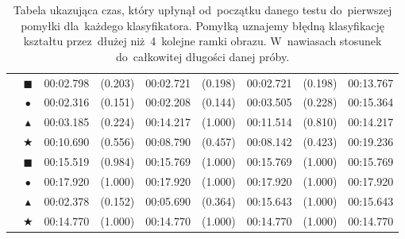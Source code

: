 \documentclass[11pt,a4paper]{article}
\begin{document}
\begin{table}[H]
\begin{tabularx}{\textwidth}{|c|c|Yr|Yr|Yr|Y|}
        \hline
        \hline
        & $\blacksquare$ & 00:02.798 & \footnotesize{(0.203)} & 00:02.721 & \footnotesize{(0.198)} & 00:02.721 & \footnotesize{(0.198)} & 00:13.767 \\
        & $\bullet$ & 00:02.316 & \footnotesize{(0.151)} & 00:02.208 & \footnotesize{(0.144)} & 00:03.505 & \footnotesize{(0.228)} & 00:15.364 \\
        & $\blacktriangle$ & 00:03.185 & \footnotesize{(0.224)} & 00:14.217 & \footnotesize{(1.000)} & 00:11.514 & \footnotesize{(0.810)} & 00:14.217 \\
        & $\bigstar$ & 00:10.690 & \footnotesize{(0.556)} & 00:08.790 & \footnotesize{(0.457)} & 00:08.142 & \footnotesize{(0.423)} & 00:19.236 \\
        \hline
        \hline
        & $\blacksquare$ & 00:15.519 & \footnotesize{(0.984)} & 00:15.769 & \footnotesize{(1.000)} & 00:15.769 & \footnotesize{(1.000)} & 00:15.769 \\
        & $\bullet$ & 00:17.920 & \footnotesize{(1.000)} & 00:17.920 & \footnotesize{(1.000)} & 00:17.920 & \footnotesize{(1.000)} & 00:17.920 \\
        & $\blacktriangle$ & 00:02.378 & \footnotesize{(0.152)} & 00:05.690 & \footnotesize{(0.364)} & 00:15.643 & \footnotesize{(1.000)} & 00:15.643 \\
        & $\bigstar$ & 00:14.770 & \footnotesize{(1.000)} & 00:14.770 & \footnotesize{(1.000)} & 00:14.770 & \footnotesize{(1.000)} & 00:14.770 \\
        \hline
    \end{tabularx}
    \caption{
        Tabela ukazująca czas, który upłynął od~początku danego testu do~pierwszej pomyłki dla~każdego klasyfikatora.
        Pomyłką uznajemy błędną klasyfikację kształtu przez~dłużej niż~4~kolejne ramki obrazu.
        W~nawiasach stosunek do~całkowitej długości danej próby.}
    \label{tab:time-trials}
\end{table}
\end{document}
